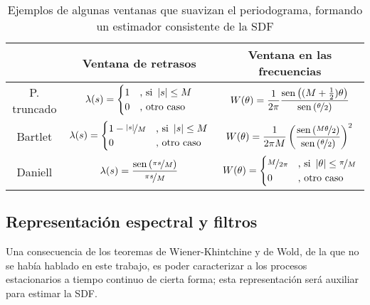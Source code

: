 \begin{table}
\centering
\begin{tabular}{c||c|c}
 & Ventana de retrasos & Ventana en las frecuencias \\
 \hline
  \hline
P. truncado & 
$\displaystyle
\lambda(s) = \begin{cases}
1 &\text{, si } \left| s \right| \leq M \\
0 &\text{, otro caso}
\end{cases}$ &
$\displaystyle
W(\theta) = \frac{1}{2\pi} \frac{\mathrm{sen}\left( (M+\frac{1}{2})\theta \right)}{\mathrm{sen}\left( \nicefrac{\theta}{2} \right)}$
\\
 \hline
Bartlet &
$\displaystyle
\lambda(s) = \begin{cases}
1-\nicefrac{\left| s \right|}{M} &\text{, si } \left| s \right| \leq M \\
0 &\text{, otro caso}
\end{cases}$ &
$\displaystyle
W(\theta) = \frac{1}{2\pi M} 
\left( \frac{\mathrm{sen}\left(  \nicefrac{M\theta}{2} \right)}{\mathrm{sen}\left( \nicefrac{\theta}{2} \right)} \right)^{2}$
\\
 \hline
Daniell &
$\displaystyle
\lambda(s) = \frac{\mathrm{sen}\left( \nicefrac{\pi s}{M} \right)}{\nicefrac{\pi s}{M}}$ &
$\displaystyle
W(\theta) = \begin{cases}
\nicefrac{M}{2\pi} &\text{, si } \left| \theta \right| \leq \nicefrac{\pi}{M} \\
0 &\text{, otro caso}
\end{cases}$
\end{tabular}
\caption{Ejemplos de algunas ventanas que suavizan el periodograma, formando
un estimador consistente de la SDF}
\label{ventanas}
\end{table}



\subsection{Representaci\'on espectral y filtros}

Una consecuencia de los teoremas de Wiener-Khintchine y de Wold, de la que no se hab\'ia hablado
en este trabajo, es poder caracterizar a los procesos estacionarios a tiempo continuo de cierta
forma; esta representaci\'on ser\'a auxiliar para estimar la SDF.


